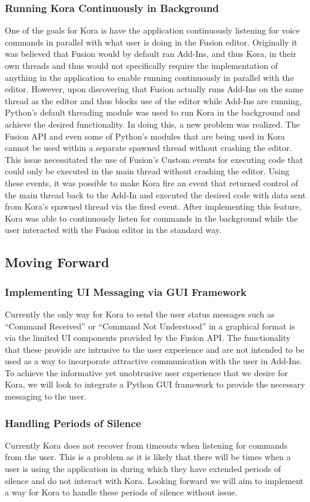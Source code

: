 \documentclass[onecolumn, draftclsnofoot,10pt, compsoc]{IEEEtran}
\begin{document}
	    \subsubsection{Running Kora Continuously in Background}
	   		One of the goals for Kora is have the application continuously listening for voice commands in parallel with what user is doing in the Fusion editor.
		    Originally it was believed that Fusion would by default ran Add-Ins, and thus Kora, in their own threads and thus would not specifically require the implementation of anything in the application to enable running continuously in parallel with the editor.
		    However, upon discovering that Fusion actually runs Add-Ins on the same thread as the editor and thus blocks use of the editor while Add-Ins are running, Python’s default threading module was used to run Kora in the background and achieve the desired functionality.
		    In doing this, a new problem was realized.
		    The Fusion API and even some of Python’s modules that are being used in Kora cannot be used within a separate spawned thread without crashing the editor.
		    This issue necessitated the use of Fusion’s Custom events for executing code that could only be executed in the main thread without crashing the editor.
		    Using these events, it was possible to make Kora fire an event that returned control of the main thread back to the Add-In and executed the desired code with data sent from Kora’s spawned thread via the fired event.
	    	After implementing this feature, Kora was able to continuously listen for commands in the background while the user interacted with the Fusion editor in the standard way.

		
	\subsection{Moving Forward}
    	\subsubsection{Implementing UI Messaging via GUI Framework}	
		    Currently the only way for Kora to send the user status messages such as “Command Received” or “Command Not Understood” in a graphical format is via the limited UI components provided by the Fusion API.
		    The functionality that these provide are intrusive to the user experience and are not intended to be used as a way to incorporate attractive communication with the user in Add-Ins.
		    To achieve the informative yet unobtrusive user experience that we desire for Kora, we will look to integrate a Python GUI framework to provide the necessary messaging to the user.

    	\subsubsection{Handling Periods of Silence}	
		    Currently Kora does not recover from timeouts when listening for commands from the user.
		    This is a problem as it is likely that there will be times when a user is using the application in during which they have extended periods of silence and do not interact with Kora.
		    Looking forward we will aim to implement a way for Kora to handle these periods of silence without issue.
\end{document}
